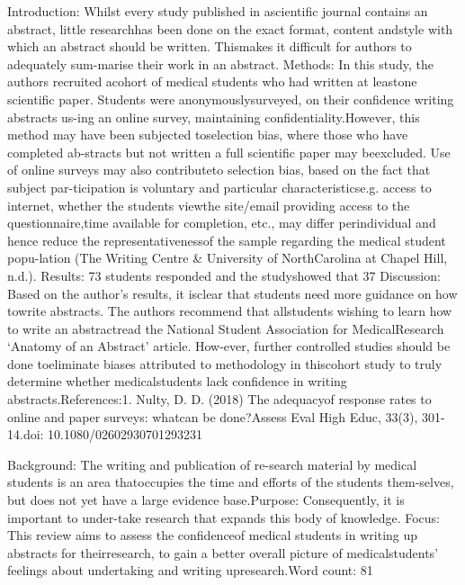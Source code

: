 \samenvatting


Introduction: Whilst every study published in ascientific journal contains an abstract, little researchhas been done on the exact format, content andstyle with which an abstract should be written. Thismakes it difficult for authors to adequately sum-marise their work in an abstract.
Methods: In this study, the authors recruited acohort of medical students who had written at leastone scientific paper. Students were anonymouslysurveyed, on their confidence writing abstracts us-ing an online survey, maintaining confidentiality.However, this method may have been subjected toselection bias, where those who have completed ab-stracts but not written a full scientific paper may beexcluded. Use of online surveys may also contributeto selection bias, based on the fact that subject par-ticipation is voluntary and particular characteristicse.g. access to internet, whether the students viewthe site/email providing access to the questionnaire,time available for completion, etc., may differ perindividual and hence reduce the representativenessof the sample regarding the medical student popu-lation (The Writing Centre & University of NorthCarolina at Chapel Hill, n.d.).
Results:  73 students responded and the studyshowed that 37 %
Discussion: Based on the author’s results, it isclear that students need more guidance on how towrite abstracts. The authors recommend that allstudents wishing to learn how to write an abstractread the National Student Association for MedicalResearch ‘Anatomy of an Abstract’ article. How-ever, further controlled studies should be done toeliminate biases attributed to methodology in thiscohort study to truly determine whether medicalstudents lack confidence in writing abstracts.References:1. Nulty, D. D. (2018) The adequacyof response rates to online and paper surveys: whatcan be done?Assess Eval High Educ, 33(3), 301-14.doi: 10.1080/02602930701293231

Background: The writing and publication of re-search material by medical students is an area thatoccupies the time and efforts of the students them-selves, but does not yet have a large evidence base.Purpose: Consequently, it is important to under-take research that expands this body of knowledge.
Focus: This review aims to assess the confidenceof medical students in writing up abstracts for theirresearch, to gain a better overall picture of medicalstudents’ feelings about undertaking and writing upresearch.Word count: 81

